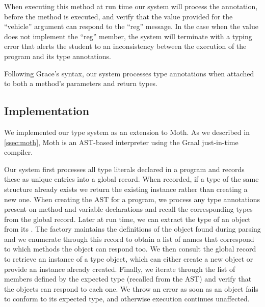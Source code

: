 When executing this method at run time
our system will process the annotation,
before the method is executed,
and verify that the value provided for the ``vehicle'' argument 
can respond to the ``reg'' message.
In the case when the value does not implement the ``reg'' member,
the system will terminate with a typing error 
that alerts the student to an inconsistency between the
execution of the program and its type annotations.



Following Grace's syntax, our system processes type annotations when attached
to both a method's parameters and return types. 

\subsection{Implementation} 
\label{ssec:implementation} 


We implemented our type system as an extension to Moth.
As we described in \cref{ssec:moth},
Moth is an AST-based interpreter
using the Graal just-in-time compiler\citep{Wurthinger:2017:PPE}.


Our system first processes all type literals declared in a program and records these as
unique entries into a global record.
When recorded, if a type of the same structure already exists we return the existing instance
rather than creating a new one.
When creating the AST for a program, 
we process any type annotations present on method and variable declarations and
recall the corresponding types from the global record. 
Later at run time, we can extract the type of an object from its .
The factory maintains the definitions of the object found during parsing and
we enumerate through this record to obtain a list of names that correspond
to which methods the object can respond too.
We then consult the global record to retrieve an instance of a type object,
which can either create a new object or provide an instance already created.
Finally, we iterate through the list of members defined by the expected type 
(recalled from the AST) and verify that the objects can respond to each one.
We throw an error as soon as an object fails to conform to its expected type, 
and otherwise execution continues unaffected.

